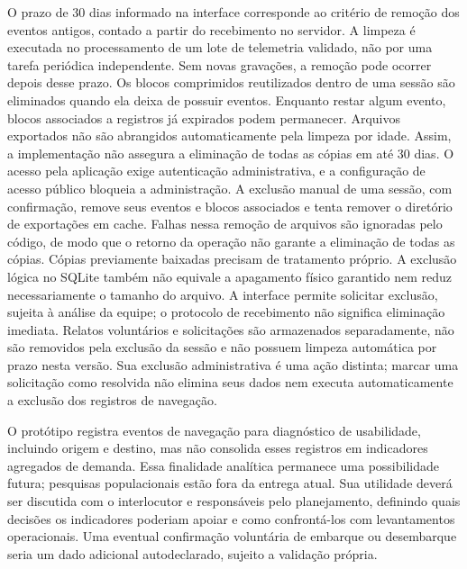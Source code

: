 \documentclass[12pt,oneside,a4paper,brazil,chapter=TITLE]{abntex2}
\begin{document}
O prazo de 30 dias informado na interface corresponde ao critério de remoção dos eventos antigos, contado a partir do recebimento no servidor. A limpeza é executada no processamento de um lote de telemetria validado, não por uma tarefa periódica independente. Sem novas gravações, a remoção pode ocorrer depois desse prazo. Os blocos comprimidos reutilizados dentro de uma sessão são eliminados quando ela deixa de possuir eventos. Enquanto restar algum evento, blocos associados a registros já expirados podem permanecer. Arquivos exportados não são abrangidos automaticamente pela limpeza por idade. Assim, a implementação não assegura a eliminação de todas as cópias em até 30 dias. O acesso pela aplicação exige autenticação administrativa, e a configuração de acesso público bloqueia a administração. A exclusão manual de uma sessão, com confirmação, remove seus eventos e blocos associados e tenta remover o diretório de exportações em cache. Falhas nessa remoção de arquivos são ignoradas pelo código, de modo que o retorno da operação não garante a eliminação de todas as cópias. Cópias previamente baixadas precisam de tratamento próprio. A exclusão lógica no SQLite também não equivale a apagamento físico garantido nem reduz necessariamente o tamanho do arquivo. A interface permite solicitar exclusão, sujeita à análise da equipe; o protocolo de recebimento não significa eliminação imediata. Relatos voluntários e solicitações são armazenados separadamente, não são removidos pela exclusão da sessão e não possuem limpeza automática por prazo nesta versão. Sua exclusão administrativa é uma ação distinta; marcar uma solicitação como resolvida não elimina seus dados nem executa automaticamente a exclusão dos registros de navegação.

O protótipo registra eventos de navegação para diagnóstico de usabilidade, incluindo origem e destino, mas não consolida esses registros em indicadores agregados de demanda. Essa finalidade analítica permanece uma possibilidade futura; pesquisas populacionais estão fora da entrega atual. Sua utilidade deverá ser discutida com o interlocutor e responsáveis pelo planejamento, definindo quais decisões os indicadores poderiam apoiar e como confrontá-los com levantamentos operacionais. Uma eventual confirmação voluntária de embarque ou desembarque seria um dado adicional autodeclarado, sujeito a validação própria.
\end{document}
